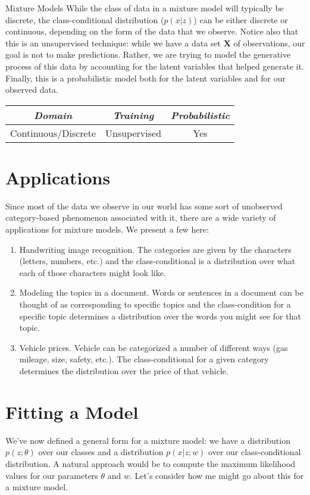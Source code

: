 \begin{mlcube}{Mixture Models}
While the class of data in a mixture model will typically be discrete, the class-conditional distribution ($p(x | z)$) can be either discrete or continuous, depending on the form of the data that we observe. Notice also that this is an unsupervised technique: while we have a data set $\textbf{X}$ of observations, our goal is not to make predictions. Rather, we are trying to model the generative process of this data by accounting for the latent variables that helped generate it. Finally, this is a probabilistic model both for the latent variables and for our observed data.
\begin{center}
    \begin{tabular}{c|c|c}
    \textit{\textbf{Domain}} & \textit{\textbf{Training}} & \textit{\textbf{Probabilistic}} \\
    \hline
    Continuous/Discrete & Unsupervised & Yes \\
    \end{tabular}
\end{center}
\end{mlcube}

\section{Applications}
Since most of the data we observe in our world has some sort of unobserved category-based phenomenon associated with it, there are a wide variety of applications for mixture models. We present a few here:
\begin{enumerate}
    \item Handwriting image recognition. The categories are given by the characters (letters, numbers, etc.) and the class-conditional is a distribution over what each of those characters might look like.
    \item Modeling the topics in a document. Words or sentences in a document can be thought of as corresponding to specific topics and the class-condition for a specific topic determines a distribution over the words you might see for that topic.
    \item Vehicle prices. Vehicle can be categorized a number of different ways (gas mileage, size, safety, etc.). The class-conditional for a given category determines the distribution over the price of that vehicle.
\end{enumerate}

\section{Fitting a Model}
We've now defined a general form for a mixture model: we have a distribution $p(z; \theta)$ over our classes and a distribution $p(x|z; w)$ over our class-conditional distribution. A natural approach would be to compute the maximum likelihood values for our parameters $\theta$ and $w$. Let's consider how me might go about this for a mixture model.

